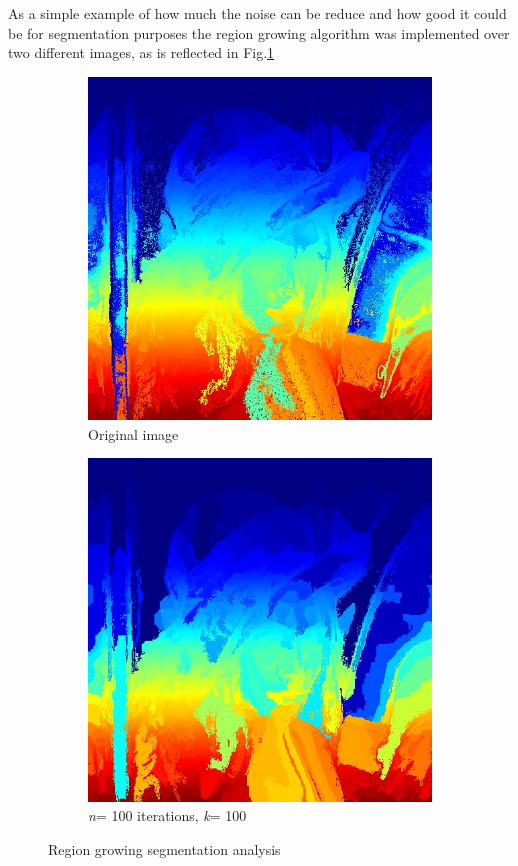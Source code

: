 \documentclass[a4paper, 10pt, conference] {article}
\begin{document}
As a simple example of how much the noise can be reduce and how good it could be for segmentation purposes the region growing algorithm was implemented over two different images, as is reflected in Fig.\ref{regionGrowing}
\begin{figure}[H]
 	\centering
 	\begin{subfigure}{0.45\textwidth} 						
 	\centering
 	\includegraphics[scale=0.35]{original_segmented.JPG}
		\caption{Original image}
	\end{subfigure}
	\begin{subfigure}{0.45\textwidth}
	\centering
	 						\includegraphics[scale=0.35]{filtered_segmented.JPG}
		\caption{\textit{n}= 100 iterations, \textit{k}= 100}
	\end{subfigure}
	\caption{Region growing segmentation analysis}
	\label{regionGrowing}
\end{figure}
\end{document}
